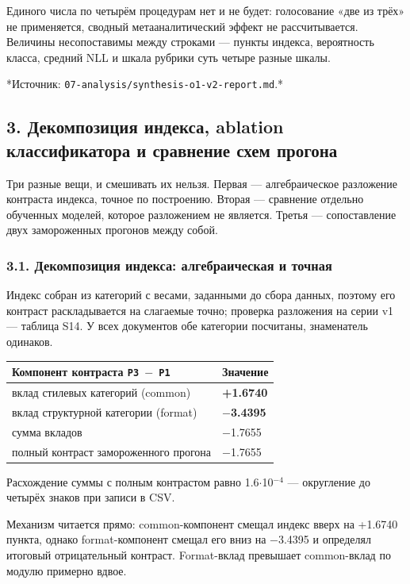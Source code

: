 \documentclass[11pt,a4paper]{article}
\renewcommand{\_}{\textunderscore\allowbreak}
\begin{document}
Единого числа по четырём процедурам нет и не будет: голосование «две из трёх» не
применяется, сводный метааналитический эффект не рассчитывается. Величины
несопоставимы между строками — пункты индекса, вероятность класса, средний NLL и
шкала рубрики суть четыре разные шкалы.

*Источник: \texttt{07-\allowbreak{}analysis/synthesis-\allowbreak{}o1-\allowbreak{}v2-\allowbreak{}report.md}.*

\subsection{3. Декомпозиция индекса, ablation классификатора и сравнение схем прогона}

Три разные вещи, и смешивать их нельзя. Первая — алгебраическое разложение
контраста индекса, точное по построению. Вторая — сравнение отдельно обученных
моделей, которое разложением не является. Третья — сопоставление двух
замороженных прогонов между собой.

\subsubsection{3.1. Декомпозиция индекса: алгебраическая и точная}

Индекс собран из категорий с весами, заданными до сбора данных, поэтому его
контраст раскладывается на слагаемые точно; проверка разложения на серии v1 —
таблица S14. У всех документов обе категории
посчитаны, знаменатель одинаков.

\begin{center}
\small
\begin{tabular}{ll}
\toprule
Компонент контраста \texttt{P3 $-$ P1} & Значение \\
\midrule
вклад стилевых категорий (common) & \textbf{+1.6740} \\
вклад структурной категории (format) & \textbf{$-$3.4395} \\
сумма вкладов & $-$1.7655 \\
полный контраст замороженного прогона & $-$1.7655 \\
\bottomrule
\end{tabular}
\end{center}

Расхождение суммы с полным контрастом равно 1.6$\cdot$10$^{-4}$ — округление до четырёх
знаков при записи в CSV.

Механизм читается прямо: common-компонент смещал индекс вверх на +1.6740 пункта,
однако format-компонент смещал его вниз на $-$3.4395 и определял итоговый
отрицательный контраст. Format-вклад превышает common-вклад по модулю примерно
вдвое.
\end{document}

